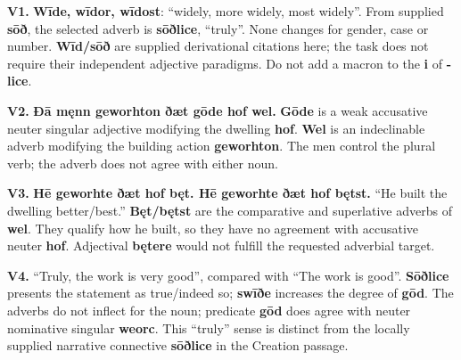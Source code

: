 \par\begin{minipage}{\linewidth}\raggedright
\textbf{V1.} \textbf{Wīde, wīdor, wīdost}: “widely, more widely, most widely”. From supplied \textbf{sōð}, the selected adverb is \textbf{sōðlice}, “truly”. None changes for gender, case or number. \textbf{Wīd/\allowbreak{}sōð} are supplied derivational citations here; the task does not require their independent adjective paradigms. Do not add a macron to the \textbf{i} of \textbf{-lice}.

\end{minipage}\par\addvspace{4pt}

\par\begin{minipage}{\linewidth}\raggedright
\textbf{V2.} \textbf{Ðā męnn geworhton ðæt gōde hof wel.} \textbf{Gōde} is a weak accusative neuter singular adjective modifying the dwelling \textbf{hof}. \textbf{Wel} is an indeclinable adverb modifying the building action \textbf{geworhton}. The men control the plural verb; the adverb does not agree with either noun.

\end{minipage}\par\addvspace{4pt}

\par\begin{minipage}{\linewidth}\raggedright
\textbf{V3.} \textbf{Hē geworhte ðæt hof bęt. Hē geworhte ðæt hof bętst.} “He built the dwelling better/\allowbreak{}best.” \textbf{Bęt/\allowbreak{}bętst} are the comparative and superlative adverbs of \textbf{wel}. They qualify how he built, so they have no agreement with accusative neuter \textbf{hof}. Adjectival \textbf{bętere} would not fulfill the requested adverbial target.

\end{minipage}\par\addvspace{4pt}

\par\begin{minipage}{\linewidth}\raggedright
\textbf{V4.} “Truly, the work is very good”, compared with “The work is good”. \textbf{Sōðlice} presents the statement as true/\allowbreak{}indeed so; \textbf{swīðe} increases the degree of \textbf{gōd}. The adverbs do not inflect for the noun; predicate \textbf{gōd} does agree with neuter nominative singular \textbf{weorc}. This “truly” sense is distinct from the locally supplied narrative connective \textbf{sōðlice} in the Creation passage.

\end{minipage}\par\addvspace{4pt}

